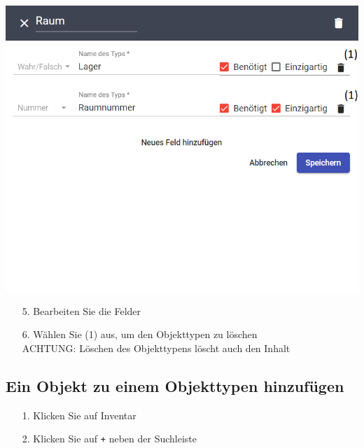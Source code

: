 \documentclass[11pt,a4paper]{report}
\begin{document}
	\begin{minipage}{0.5\linewidth}
	\includegraphics[width=\linewidth]{Objekttypedit2.png}
	\end{minipage}
	\hfill
	\begin{minipage}{0.4\linewidth}
	\begin{itemize}
		\item[5.] Bearbeiten Sie die Felder
		\item[6.] Wählen Sie (1) aus, um den Objekttypen zu löschen\\
		ACHTUNG: Löschen des Objekttypens löscht auch den Inhalt
	\end{itemize}
	\end{minipage}
\clearpage

	\subsection{Ein Objekt zu einem Objekttypen hinzufügen}

	\begin{itemize}
		\item[1.] Klicken Sie auf \glqq{}Inventar\grqq{}
		\item[2.] Klicken Sie auf \texttt{+} neben der Suchleiste
	\end{itemize}
\end{document}
